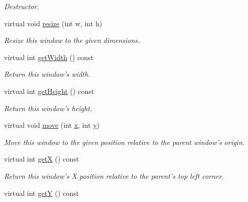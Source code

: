 \begin{DoxyCompactItemize}
\begin{DoxyCompactList}\small\item\em Destructor. \end{DoxyCompactList}\item 
virtual void \hyperlink{classGUI_1_1Window_a274ad6d6e68c94b165aa58700759f418}{resize} (int w, int h)
\begin{DoxyCompactList}\small\item\em Resize this window to the given dimensions. \end{DoxyCompactList}\item 
\hypertarget{classGUI_1_1Window_a6b1f6016050ed470f34fe50833cd94e9}{virtual int \hyperlink{classGUI_1_1Window_a6b1f6016050ed470f34fe50833cd94e9}{get\-Width} () const }\label{classGUI_1_1Window_a6b1f6016050ed470f34fe50833cd94e9}

\begin{DoxyCompactList}\small\item\em Return this window's width. \end{DoxyCompactList}\item 
\hypertarget{classGUI_1_1Window_a373b4ac56a16274c34d0e133b000a151}{virtual int \hyperlink{classGUI_1_1Window_a373b4ac56a16274c34d0e133b000a151}{get\-Height} () const }\label{classGUI_1_1Window_a373b4ac56a16274c34d0e133b000a151}

\begin{DoxyCompactList}\small\item\em Return this window's height. \end{DoxyCompactList}\item 
virtual void \hyperlink{classGUI_1_1Window_a426af83d31a4c42b4e8f011fc3aa9555}{move} (int \hyperlink{classGUI_1_1Window_a6ca6a80ca00c9e1d8ceea8d3d99a657d}{x}, int \hyperlink{classGUI_1_1Window_a0ee8e923aff2c3661fc2e17656d37adf}{y})
\begin{DoxyCompactList}\small\item\em Move this window to the given position relative to the parent window's origin. \end{DoxyCompactList}\item 
\hypertarget{classGUI_1_1Window_aca57a4ba1680e74d25f628ab9505e058}{virtual int \hyperlink{classGUI_1_1Window_aca57a4ba1680e74d25f628ab9505e058}{get\-X} () const }\label{classGUI_1_1Window_aca57a4ba1680e74d25f628ab9505e058}

\begin{DoxyCompactList}\small\item\em Return this window's X position relative to the parent's top left corner. \end{DoxyCompactList}\item 
\hypertarget{classGUI_1_1Window_a61f8ac63ed3eaba052a5ed1534eccdb3}{virtual int \hyperlink{classGUI_1_1Window_a61f8ac63ed3eaba052a5ed1534eccdb3}{get\-Y} () const }\label{classGUI_1_1Window_a61f8ac63ed3eaba052a5ed1534eccdb3}


\end{DoxyCompactItemize}
